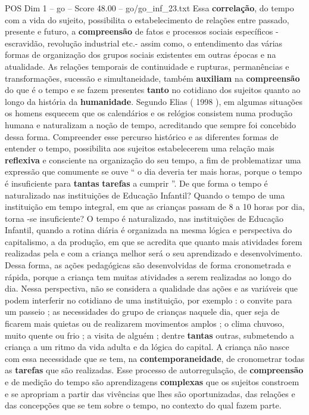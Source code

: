 \begin{textsample}{POS Dim 1 – go – Score 48.00 – go/go\_inf\_23.txt}
Essa \textbf{correlação}, do tempo com a vida do sujeito, possibilita o estabelecimento de relações entre passado, presente e futuro, a \textbf{compreensão} de fatos e processos sociais específicos - escravidão, revolução industrial etc.- assim como, o entendimento das várias formas de organização dos grupos sociais existentes em outras épocas e na atualidade.
As relações temporais de continuidade e rupturas, permanências e transformações, sucessão e simultaneidade, também \textbf{auxiliam} na \textbf{compreensão} do que é o tempo e se fazem presentes \textbf{tanto} no cotidiano dos sujeitos quanto ao longo da história da \textbf{humanidade}.
Segundo Elias ( 1998 ), em algumas situações os homens esquecem que os calendários e os relógios consistem numa produção humana e naturalizam a noção de tempo, acreditando que sempre foi concebido dessa forma.
Compreender esse percurso histórico e as diferentes formas de entender o tempo, possibilita aos sujeitos estabelecerem uma relação mais \textbf{reflexiva} e consciente na organização do seu tempo, a fim de problematizar uma expressão que comumente se ouve “ o dia deveria ter mais horas, porque o tempo é insuficiente para \textbf{tantas} \textbf{tarefas} a cumprir ”.
De que forma o tempo é naturalizado nas instituições de Educação Infantil?
Quando o tempo de uma instituição em tempo integral, em que as crianças passam de 8 a 10 horas por dia, torna -se insuficiente?
O tempo é naturalizado, nas instituições de Educação Infantil, quando a rotina diária é organizada na mesma lógica e perspectiva do capitalismo, a da produção, em que se acredita que quanto mais atividades forem realizadas pela e com a criança melhor será o seu aprendizado e desenvolvimento.
Dessa forma, as ações pedagógicas são desenvolvidas de forma cronometrada e rápida, porque a criança tem muitas atividades a serem realizadas ao longo do dia.
Nessa perspectiva, não se considera a qualidade das ações e as variáveis que podem interferir no cotidiano de uma instituição, por exemplo : o convite para um passeio ; as necessidades do grupo de crianças naquele dia, quer seja de ficarem mais quietas ou de realizarem movimentos amplos ; o clima chuvoso, muito quente ou frio ; a visita de alguém ; dentre \textbf{tantas} outras, submetendo a criança a um ritmo da vida adulta e da lógica do capital.
A criança não nasce com essa necessidade que se tem, na \textbf{contemporaneidade}, de cronometrar todas as \textbf{tarefas} que são realizadas.
Esse processo de autorregulação, de \textbf{compreensão} e de medição do tempo são aprendizagens \textbf{complexas} que os sujeitos constroem e se apropriam a partir das vivências que lhes são oportunizadas, das relações e das concepções que se tem sobre o tempo, no contexto do qual fazem parte.

\end{textsample}

